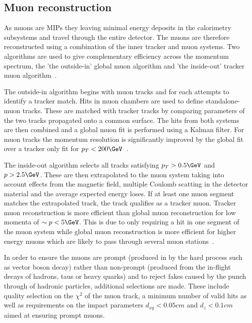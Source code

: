 \subsection{Muon reconstruction}
\label{sec:muon_reco}

As muons are MIPs they leaving minimal energy deposits in the calorimetry
subsystems and travel through the entire detector. The muons are therefore reconstructed using a 
combination of the inner tracker and muon systems. Two algorithms are used to 
give complementary efficiency across the momentum spectrum, the 'the outside-in' 
global muon algorithm and 'the inside-out' tracker muon algorithm~\cite{muon_reco}.

The outside-in algorithm begins with muon tracks and for each attempts to
identify a tracker match. Hits in muon chambers are used to define standalone-muon tracks. 
These are matched with tracker tracks by comparing parameters of the two tracks propagated 
onto a common surface. The hits from both systems are then combined and a global muon fit 
is performed using a Kalman filter. For muon tracks the momentum resolution is significantly improved by 
the global fit over a tracker only fit for $p_T < 200\GeV$~\cite{CMS,muon_reco_cosmic}. 

The inside-out algorithm selects all tracks satisfying $p_T > 0.5\GeV$ and $p > 2.5\GeV$. These are then 
extrapolated to the muon system taking into account effects from the magnetic field, multiple Coulomb scatting
in the detector material and the average expected energy loses. If at least one muon segment matches 
the extrapolated track, the track qualifies as a tracker muon. Tracker muon reconstruction is more efficient
than global muon reconstruction for low momenta of $\sim p< 5\GeV$. This is due
to only requiring a hit in one segment of the muon system while global muon reconstruction is 
more efficient for higher energy muons which are likely to pass through several muon stations~\cite{muon_reco}.

In order to ensure the muons are prompt (produced in by the hard process such as vector boson decay) rather
than non-prompt (produced from the in-flight decays of hadrons, taus or heavy quarks) and to reject fakes
caused by the punch through of hadronic particles, additional selections are made. These include quality
selection on the $\chi^2$ of the muon track, a minimum number of valid hits as well as requirements
on the impact parameters $d_{xy} < 0.05 cm$ and $d_{z} < 0.1 cm$ aimed at ensuring prompt muons.

